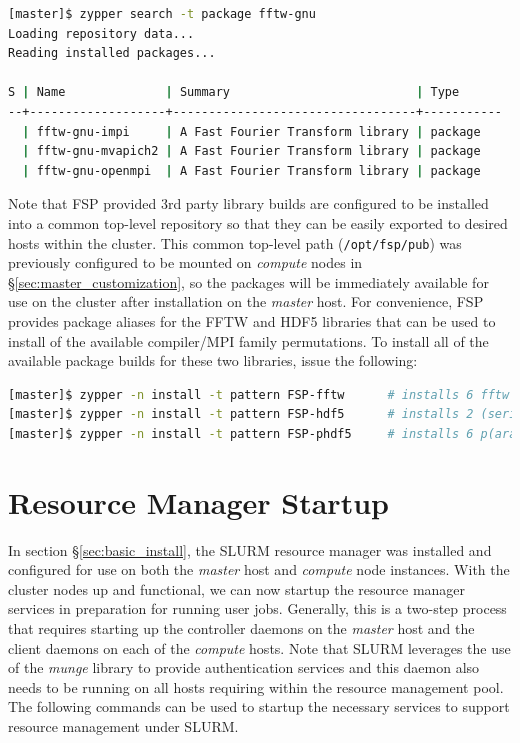 \documentclass[letterpaper]{article}
\begin{document}
\begin{lstlisting}[language=bash]
[master]$ zypper search -t package fftw-gnu
Loading repository data...
Reading installed packages...

S | Name              | Summary                          | Type      
--+-------------------+----------------------------------+-----------
  | fftw-gnu-impi     | A Fast Fourier Transform library | package   
  | fftw-gnu-mvapich2 | A Fast Fourier Transform library | package   
  | fftw-gnu-openmpi  | A Fast Fourier Transform library | package   
\end{lstlisting}

Note that FSP provided 3rd party library builds are configured to be installed
into a common top-level repository so that they can be easily exported to
desired hosts within the cluster. This common top-level path (\texttt{/opt/fsp/pub})
was previously configured to be mounted on {\em compute} nodes in
\S\ref{sec:master_customization}, so the packages will be immediately available
for use on the cluster after installation on the {\em master} host.  For
convenience, FSP provides package aliases for the FFTW and HDF5 libraries that
can be used to install of the available compiler/MPI family permutations. To
install all of the available package builds for these two libraries, issue the
following:

\begin{lstlisting}[language=bash]
[master]$ zypper -n install -t pattern FSP-fftw      # installs 6 fftw packages
[master]$ zypper -n install -t pattern FSP-hdf5      # installs 2 (serial) hdf5 packages
[master]$ zypper -n install -t pattern FSP-phdf5     # installs 6 p(arallel) hdf5 packages
\end{lstlisting}

\section{Resource Manager Startup}

In section \S\ref{sec:basic_install}, the SLURM resource manager was installed
and configured for use on both the {\em master} host and {\em compute} node
instances. With the cluster nodes up and functional, we can now startup the
resource manager services in preparation for running user jobs. Generally, this
is a two-step process that requires starting up the controller daemons on the {\em
  master} host and the client daemons on each of the {\em compute} hosts.  
Note that SLURM leverages the use of the {\em munge} library to provide
authentication services and this daemon also needs to be running on all hosts
requiring within the resource management pool. 
The following commands can be used to startup the necessary services to support
resource management under SLURM.
\end{document}
